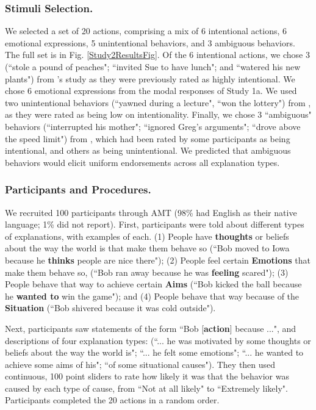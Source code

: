 \documentclass[10pt,letterpaper]{article}
\newcommand{\ndg}[1]{\textcolor{Green}{[ndg: #1]}}
\begin{document}
\subsubsection{Stimuli Selection.} We selected a set of 20 actions, comprising a mix of 6 intentional actions, 6 emotional expressions, 5 unintentional behaviors, and 3 ambiguous behaviors. The full set is in Fig. \ref{Study2ResultsFig}. Of the 6 intentional actions, we chose 3 (``stole a pound of peaches"; ``invited Sue to have lunch"; and ``watered his new plants") from 's study as they were previously rated as  highly intentional.%
We chose 6 emotional expressions from the modal responses of Study 1a. We used two unintentional behaviors (``yawned during a lecture", ``won the lottery") from , as they were rated as being low on intentionality.
Finally, we chose 3 ``ambiguous" behaviors (``interrupted his mother"; ``ignored Greg's arguments"; ``drove above the speed limit") from , which had been rated by some participants as being intentional, and others as being unintentional.
We predicted that ambiguous behaviors would elicit uniform endorsements across all explanation types.

\subsubsection{Participants and Procedures.} 
We recruited 100 participants through AMT (98\% had English as their native language; 1\% did not report).
First, participants were told about different types of explanations, with examples of each. (1) People have \textbf{thoughts} or beliefs about the way the world is that make them behave so (``Bob moved to Iowa because he \textbf{thinks} people are nice there"); 
(2) People feel certain \textbf{Emotions} that make them behave so, (``Bob ran away because he was \textbf{feeling} scared"); 
(3) People behave that way to achieve certain \textbf{Aims} (``Bob kicked the ball because he \textbf{wanted to} win the game"); and 
(4) People behave that way because of the \textbf{Situation} (``Bob shivered because it was cold outside").

Next, participants saw statements of the form ``Bob [\textbf{action}] because ...", and descriptions of four explanation types: (``... he was motivated by some thoughts or beliefs about the way the world is"; ``... he felt some emotions"; ``... he wanted to achieve some aims of his"; ``of some situational causes"). They then used continuous, 100 point sliders to rate how likely it was that the behavior was caused by each type of cause, from ``Not at all likely" to ``Extremely likely". Participants completed the 20 actions in a random order.
\end{document}
